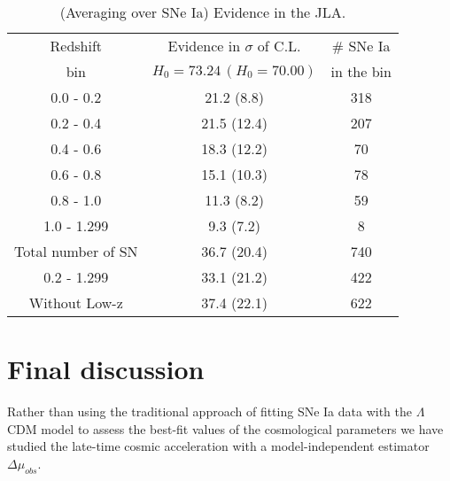 \documentclass[nofootinbib,twocolumn]{revtex4}
\begin{document}


\begin{table}
\centering\caption{(Averaging over SNe Ia) Evidence in the JLA.  }
{\begin{tabular} {c||c||c}
Redshift & Evidence  in $\sigma$ of C.L. & \# SNe Ia \\
bin & $H_0=73.24 \, (H_0=70.00)$& in the bin \\
\hline \hline
0.0 - 0.2 & 21.2 (8.8) & 318 \\
0.2 - 0.4 & 21.5 (12.4) & 207 \\
0.4 - 0.6 & 18.3 (12.2) & 70  \\
0.6 - 0.8 & 15.1 (10.3) & 78  \\
0.8 - 1.0 & 11.3 (8.2) & 59  \\
1.0 - 1.299 & 9.3 (7.2) & 8  \\
Total number of SN & 36.7 (20.4) & 740  \\
0.2 - 1.299 & 33.1 (21.2) & 422  \\
Without Low-z & 37.4 (22.1) & 622\\
\hline
\end{tabular}} 
\label{TableAveJLA}
\end{table}






\section{Final discussion}

Rather than using the traditional approach of fitting SNe Ia data with the $\Lambda$CDM model to assess the best-fit values of the cosmological parameters we have studied the late-time cosmic acceleration with a model-independent estimator $\Delta \mu_{obs}$.  
\end{document}
